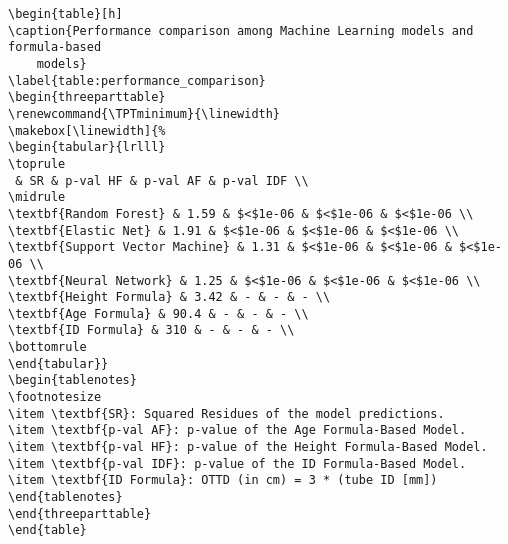 \documentclass[11pt]{article}
\begin{document}
\begin{Verbatim}[tabsize=4]
\begin{table}[h]
\caption{Performance comparison among Machine Learning models and formula-based
	models}
\label{table:performance_comparison}
\begin{threeparttable}
\renewcommand{\TPTminimum}{\linewidth}
\makebox[\linewidth]{%
\begin{tabular}{lrlll}
\toprule
 & SR & p-val HF & p-val AF & p-val IDF \\
\midrule
\textbf{Random Forest} & 1.59 & $<$1e-06 & $<$1e-06 & $<$1e-06 \\
\textbf{Elastic Net} & 1.91 & $<$1e-06 & $<$1e-06 & $<$1e-06 \\
\textbf{Support Vector Machine} & 1.31 & $<$1e-06 & $<$1e-06 & $<$1e-06 \\
\textbf{Neural Network} & 1.25 & $<$1e-06 & $<$1e-06 & $<$1e-06 \\
\textbf{Height Formula} & 3.42 & - & - & - \\
\textbf{Age Formula} & 90.4 & - & - & - \\
\textbf{ID Formula} & 310 & - & - & - \\
\bottomrule
\end{tabular}}
\begin{tablenotes}
\footnotesize
\item \textbf{SR}: Squared Residues of the model predictions.
\item \textbf{p-val AF}: p-value of the Age Formula-Based Model.
\item \textbf{p-val HF}: p-value of the Height Formula-Based Model.
\item \textbf{p-val IDF}: p-value of the ID Formula-Based Model.
\item \textbf{ID Formula}: OTTD (in cm) = 3 * (tube ID [mm])
\end{tablenotes}
\end{threeparttable}
\end{table}

\end{Verbatim}
\end{document}
